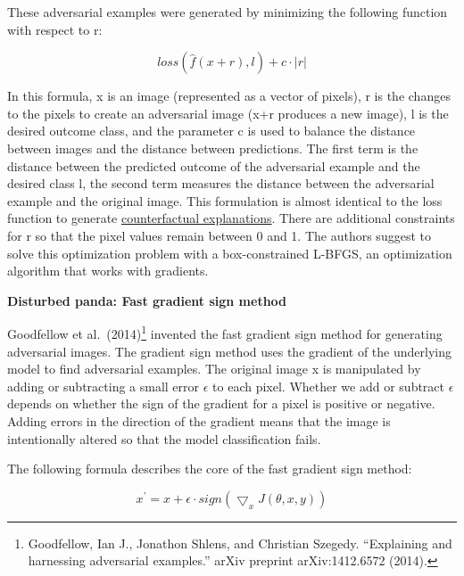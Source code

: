 \documentclass[
  11pt,
]{scrbook}
\begin{document}
These adversarial examples were generated by minimizing the following function with respect to r:

\[loss(\hat{f}(x+r),l)+c\cdot|r|\]

In this formula, x is an image (represented as a vector of pixels), r is the changes to the pixels to create an adversarial image (x+r produces a new image), l is the desired outcome class, and the parameter c is used to balance the distance between images and the distance between predictions.
The first term is the distance between the predicted outcome of the adversarial example and the desired class l, the second term measures the distance between the adversarial example and the original image.
This formulation is almost identical to the loss function to generate \protect\hyperlink{counterfactual}{counterfactual explanations}.
There are additional constraints for r so that the pixel values remain between 0 and 1.
The authors suggest to solve this optimization problem with a box-constrained L-BFGS, an optimization algorithm that works with gradients.

\textbf{Disturbed panda: Fast gradient sign method}

Goodfellow et al.~(2014)\footnote{Goodfellow, Ian J., Jonathon Shlens, and Christian Szegedy. ``Explaining and harnessing adversarial examples.'' arXiv preprint arXiv:1412.6572 (2014).} invented the fast gradient sign method for generating adversarial images.
The gradient sign method uses the gradient of the underlying model to find adversarial examples.
The original image x is manipulated by adding or subtracting a small error \(\epsilon\) to each pixel.
Whether we add or subtract \(\epsilon\) depends on whether the sign of the gradient for a pixel is positive or negative.
Adding errors in the direction of the gradient means that the image is intentionally altered so that the model classification fails.

The following formula describes the core of the fast gradient sign method:

\[x^\prime=x+\epsilon\cdot{}sign(\bigtriangledown_x{}J(\theta,x,y))\]
\end{document}
